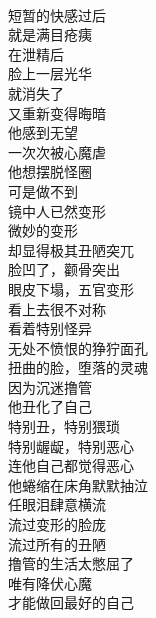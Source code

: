 \begin{poem}[撸管变形记]
    \begin{multicols}{3}
        \centering~\\
        短暂的快感过后 \\ 就是满目疮痍 \\ 在泄精后 \\ 脸上一层光华 \\ 就消失了 \\ 又重新变得晦暗 \\ 他感到无望 \\ 一次次被心魔虐 \\ 他想摆脱怪圈 \\ 可是做不到 \\ 镜中人已然变形 \\ 微妙的变形 \\ 却显得极其丑陋突兀 \\ 脸凹了，颧骨突出 \\ 眼皮下塌，五官变形 \\ 看上去很不对称 \\ 看着特别怪异 \\ 无处不愤恨的狰狞面孔 \\ 扭曲的脸，堕落的灵魂 \\ 因为沉迷撸管 \\ 他丑化了自己 \\ 特别丑，特别猥琐 \\ 特别龌龊，特别恶心 \\ 连他自己都觉得恶心 \\ 他蜷缩在床角默默抽泣 \\ 任眼泪肆意横流 \\ 流过变形的脸庞 \\ 流过所有的丑陋 \\ 撸管的生活太憋屈了 \\ 唯有降伏心魔 \\ 才能做回最好的自己
    \end{multicols}
\end{poem}


